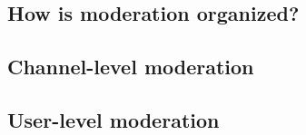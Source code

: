 \subsection{How is moderation organized?}

\subsection{Channel-level moderation}

\subsection{User-level moderation}